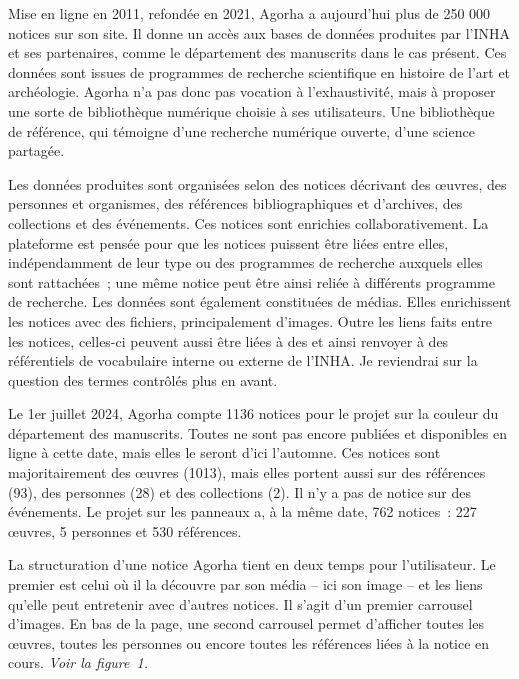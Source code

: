 Mise en ligne en 2011, refondée en 2021, Agorha a aujourd’hui plus de 250 000 notices sur son site. Il donne un accès aux bases de données produites par l’INHA et ses partenaires, comme le département des manuscrits dans le cas présent. Ces données sont issues de programmes de recherche scientifique en histoire de l’art et archéologie. Agorha n’a pas donc pas vocation à l’exhaustivité, mais à proposer une sorte de bibliothèque numérique choisie à ses utilisateurs. Une bibliothèque de référence, qui témoigne d’une recherche numérique ouverte, d’une science partagée. \par
Les données produites sont organisées selon des notices décrivant des œuvres, des personnes et organismes, des références bibliographiques et d’archives, des collections et des événements. Ces notices sont enrichies collaborativement. La plateforme est pensée pour que les notices puissent être liées entre elles, indépendamment de leur type ou des programmes de recherche auxquels elles sont rattachées ; une même notice peut être ainsi reliée à différents programme de recherche. Les données sont également constituées de médias. Elles enrichissent les notices avec des fichiers, principalement d’images. Outre les liens faits entre les notices, celles-ci peuvent aussi être liées à des  et ainsi renvoyer à des référentiels de vocabulaire interne ou externe de l’INHA. Je reviendrai sur la question des termes contrôlés plus en avant. \newline\par
Le 1er juillet 2024, Agorha compte 1136 notices pour le projet sur la couleur du département des manuscrits. Toutes ne sont pas encore publiées et disponibles en ligne à cette date, mais elles le seront d’ici l’automne. Ces notices sont majoritairement des œuvres (1013), mais elles portent aussi sur des références (93), des personnes (28) et des collections (2). Il n’y a pas de notice sur des événements. Le projet sur les panneaux a, à la même date, 762 notices~: 227 œuvres, 5 personnes et 530 références.\par
La structuration d’une notice Agorha tient en deux temps pour l’utilisateur. Le premier est celui où il la découvre par son média – ici son image – et les liens qu’elle peut entretenir avec d’autres notices. Il s’agit d’un premier carrousel d’images. En bas de la page, une second carrousel permet d’afficher toutes les œuvres, toutes les personnes ou encore toutes les références liées à la notice en cours. \textit{Voir la figure~1.} \par

